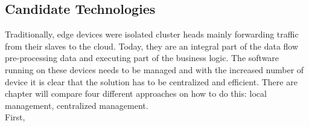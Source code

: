 \subsection{Candidate Technologies}
Traditionally, edge devices were isolated cluster heads mainly forwarding traffic from their slaves to the cloud. Today, they are an integral part of the data flow pre-processing data and executing part of the business logic. The software running on these devices needs to be managed and with the increased number of device it is clear that the solution has to be centralized and efficient. There are  chapter will compare four different approaches on how to do this: local management, centralized management. \\
First,

